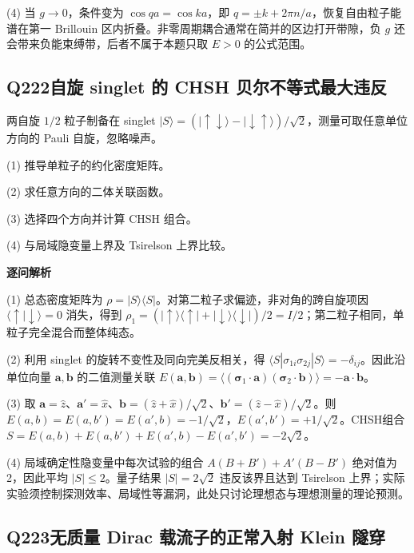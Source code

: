 (4) 当 $g\to0$，条件变为 $\cos qa=\cos ka$，即 $q=\pm k+2\pi n/a$，恢复自由粒子能谱在第一 Brillouin 区内折叠。非零周期耦合通常在简并的区边打开带隙，负 $g$ 还会带来负能束缚带，后者不属于本题只取 $E>0$ 的公式范围。

\par\medskip

\subsection*{Q222\quad 自旋 singlet 的 CHSH 贝尔不等式最大违反}

两自旋 $1/2$ 粒子制备在 singlet $|S\rangle=(|\uparrow\downarrow\rangle-|\downarrow\uparrow\rangle)/\sqrt2$，测量可取任意单位方向的 Pauli 自旋，忽略噪声。

(1) 推导单粒子的约化密度矩阵。

(2) 求任意方向的二体关联函数。

(3) 选择四个方向并计算 CHSH 组合。

(4) 与局域隐变量上界及 Tsirelson 上界比较。

\par\textbf{逐问解析}

(1) 总态密度矩阵为 $\rho=|S\rangle\langle S|$。对第二粒子求偏迹，非对角的跨自旋项因 $\langle\uparrow|\downarrow\rangle=0$ 消失，得到 $\rho_1=(|\uparrow\rangle\langle\uparrow|+|\downarrow\rangle\langle\downarrow|)/2=I/2$；第二粒子相同，单粒子完全混合而整体纯态。

(2) 利用 singlet 的旋转不变性及同向完美反相关，得 $\langle S|\sigma_{1i}\sigma_{2j}|S\rangle=-\delta_{ij}$。因此沿单位向量 $\mathbf a,\mathbf b$ 的二值测量关联 $E(\mathbf a,\mathbf b)=\langle(\boldsymbol\sigma_1\cdot\mathbf a)(\boldsymbol\sigma_2\cdot\mathbf b)\rangle=-\mathbf a\cdot\mathbf b$。

(3) 取 $\mathbf a=\hat z$、$\mathbf a'=\hat x$、$\mathbf b=(\hat z+\hat x)/\sqrt2$、$\mathbf b'=(\hat z-\hat x)/\sqrt2$。则 $E(a,b)=E(a,b')=E(a',b)=-1/\sqrt2$，$E(a',b')=+1/\sqrt2$。CHSH组合 $S=E(a,b)+E(a,b')+E(a',b)-E(a',b')=-2\sqrt2$。

(4) 局域确定性隐变量中每次试验的组合 $A(B+B')+A'(B-B')$ 绝对值为2，因此平均 $|S|\le2$。量子结果 $|S|=2\sqrt2$ 违反该界且达到 Tsirelson 上界；实际实验须控制探测效率、局域性等漏洞，此处只讨论理想态与理想测量的理论预测。

\par\medskip

\subsection*{Q223\quad 无质量 Dirac 载流子的正常入射 Klein 隧穿}

